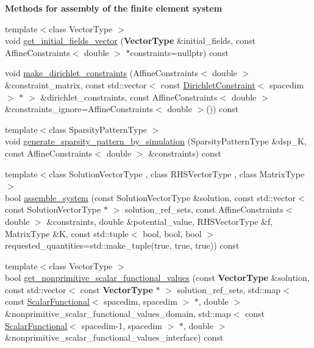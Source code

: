 \begin{Indent}{\bf Methods for assembly of the finite element system}\par
\begin{DoxyCompactItemize}
\item 
{\footnotesize template$<$class Vector\+Type $>$ }\\void \hyperlink{class_assembly_helper_ade14ba73257f862f4e9cde8d0d6df12e}{get\+\_\+initial\+\_\+fields\+\_\+vector} ({\bf Vector\+Type} \&initial\+\_\+fields, const Affine\+Constraints$<$ double $>$ $\ast$constraints=nullptr) const 
\item 
void \hyperlink{class_assembly_helper_ab9602b90beefa27eba50d9d837c1bf7b}{make\+\_\+dirichlet\+\_\+constraints} (Affine\+Constraints$<$ double $>$ \&constraint\+\_\+matrix, const std\+::vector$<$ const \hyperlink{class_dirichlet_constraint}{Dirichlet\+Constraint}$<$ spacedim $>$ $\ast$ $>$ \&dirichlet\+\_\+constraints, const Affine\+Constraints$<$ double $>$ \&constraints\+\_\+ignore=Affine\+Constraints$<$ double $>$()) const 
\item 
{\footnotesize template$<$class Sparsity\+Pattern\+Type $>$ }\\void \hyperlink{class_assembly_helper_af45c789076262ceb24613c04427b654e}{generate\+\_\+sparsity\+\_\+pattern\+\_\+by\+\_\+simulation} (Sparsity\+Pattern\+Type \&dsp\+\_\+K, const Affine\+Constraints$<$ double $>$ \&constraints) const 
\item 
{\footnotesize template$<$class Solution\+Vector\+Type , class R\+H\+S\+Vector\+Type , class Matrix\+Type $>$ }\\bool \hyperlink{class_assembly_helper_a9d2f3d1152046e639acfa6f6ac317b37}{assemble\+\_\+system} (const Solution\+Vector\+Type \&solution, const std\+::vector$<$ const Solution\+Vector\+Type $\ast$ $>$ solution\+\_\+ref\+\_\+sets, const Affine\+Constraints$<$ double $>$ \&constraints, double \&potential\+\_\+value, R\+H\+S\+Vector\+Type \&f, Matrix\+Type \&K, const std\+::tuple$<$ bool, bool, bool $>$ requested\+\_\+quantities=std\+::make\+\_\+tuple(true, true, true)) const 
\item 
{\footnotesize template$<$class Vector\+Type $>$ }\\bool \hyperlink{class_assembly_helper_a43bac43f3aecf18e08bfd1741cf30af6}{get\+\_\+nonprimitive\+\_\+scalar\+\_\+functional\+\_\+values} (const {\bf Vector\+Type} \&solution, const std\+::vector$<$ const {\bf Vector\+Type} $\ast$ $>$ solution\+\_\+ref\+\_\+sets, std\+::map$<$ const \hyperlink{class_scalar_functional}{Scalar\+Functional}$<$ spacedim, spacedim $>$ $\ast$, double $>$ \&nonprimitive\+\_\+scalar\+\_\+functional\+\_\+values\+\_\+domain, std\+::map$<$ const \hyperlink{class_scalar_functional}{Scalar\+Functional}$<$ spacedim-\/1, spacedim $>$ $\ast$, double $>$ \&nonprimitive\+\_\+scalar\+\_\+functional\+\_\+values\+\_\+interface) const 

\end{DoxyCompactItemize}
\end{Indent}
